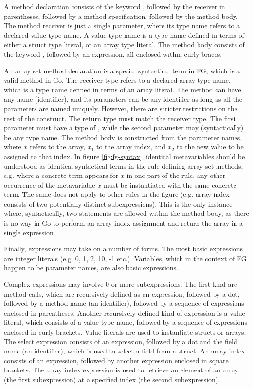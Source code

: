 A method declaration consists of the keyword \func, followed by the receiver in
parentheses, followed by a method specification, followed by the method body.
The method receiver is just a single parameter, where its type name refers to a
declared value type name. A value type name is a type name defined in terms of
either a struct type literal, or an array type literal. The method body consists
of the keyword \return, followed by an expression, all enclosed within curly
braces.

An array set method declaration is a special syntactical term in FG, which is a
valid method in Go. The receiver type refers to a declared array type name,
which is a type name defined in terms of an array literal. The method can have
any name (identifier), and its parameters can be any identifier as long as all
the parameters are named uniquely. However, there are stricter restrictions on
the rest of the construct. The return type must match the receiver type. The
first parameter must have a type of , while the second parameter may
(syntactically) be any type name. The method body is constructed from the
parameter names, where $x$ refers to the array, $x_1$ to the array index, and
$x_2$ to the new value to be assigned to that index. In figure
\ref{fig:fg-syntax}, identical metavariables should be understood as identical
syntactical terms in the rule defining array set methods, e.g. where a concrete
term appears for $x$ in one part of the rule, any other occurrence of the
metavariable $x$ must be instantiated with the same concrete term. The same does
not apply to other rules in the figure (e.g. array index consists of two
potentially distinct subexpressions). This is the only instance where,
syntactically, two statements are allowed within the method body, as there is no
way in Go to perform an array index assignment and return the array in a single
expression.

Finally, expressions may take on a number of forms. The most basic expressions
are integer literals (e.g. 0, 1, 2, 10, -1 etc.). Variables, which in the
context of FG happen to be parameter names, are also basic expressions.

Complex expressions may involve 0 or more subexpressions. The first kind are
method calls, which are recursively defined as an expression, followed by a dot,
followed by a method name (an identifier), followed by a sequence of expressions
enclosed in parentheses. Another recursively defined kind of expression is a
value literal, which consists of a value type name, followed by a sequence of
expressions enclosed in curly brackets. Value literals are used to instantiate
structs or arrays. The select expression consists of an expression, followed by
a dot and the field name (an identifier), which is used to select a field from a
struct. An array index consists of an expression, followed by another expression
enclosed in square brackets. The array index expression is used to retrieve an
element of an array (the first subexpression) at a specified index (the second
subexpression).

